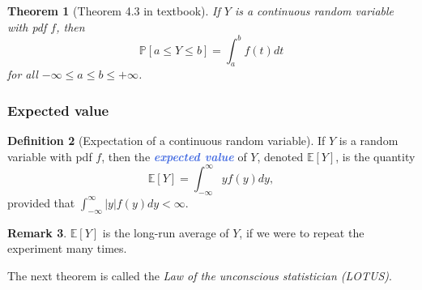 \documentclass[10pt]{article}
\newtheorem{theorem}{Theorem}
\theoremstyle{definition}
\newtheorem{definition}[theorem]{Definition}
\newtheorem{remark}[theorem]{Remark}
\newcommand{\1}[1]{\textbf{1}_{\left[#1\right]}} %
\def\E{\mathbb{E}} %
\def\P{\mathbb{P}} %
\newcommand{\demph}[1]{\textcolor{RoyalBlue}{\textbf{\slshape #1}}} %
\begin{document}
\begin{theorem}[Theorem 4.3 in textbook]
  If $Y$ is a continuous random variable with pdf $f$, then
  \begin{equation*}
    \P\left[a \leq Y \leq b\right] = \int_{a}^{b}f(t)dt
  \end{equation*}
  for all $-\infty \leq a \leq b\leq +\infty$.
\end{theorem}

\subsubsection{Expected value}
\begin{definition}[Expectation of a continuous random variable]
  \label{def:expectation-continuous-random-variable}
  If $Y$ is a random variable with pdf $f$, then the \demph{expected value} of
  $Y$, denoted $\E\left[Y \right]$, is the quantity
  \begin{equation*}
    \E\left[ Y\right] = \int_{-\infty}^{\infty} y f(y)dy,
  \end{equation*}
  provided that $\int_{-\infty}^{\infty} |y|f(y)dy<\infty$. 
\end{definition}

\begin{remark}
  $\E\left[Y \right]$ is the long-run average of $Y$, if we were to repeat the
  experiment many times.
\end{remark}

The next theorem is called the \textit{Law of the unconscious statistician (LOTUS)}.
\end{document}
